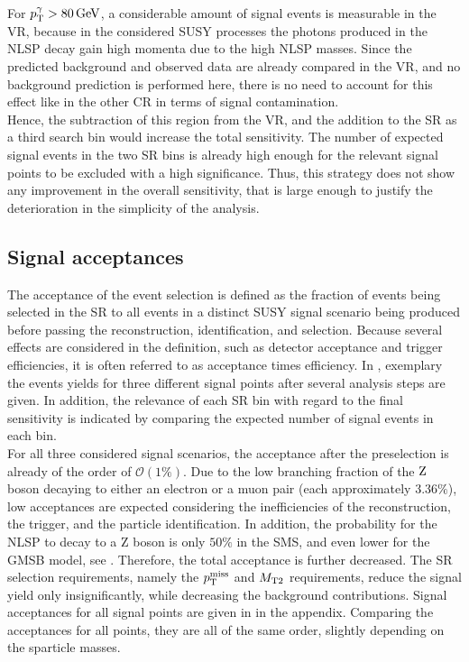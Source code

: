 For $p_{\mathrm{T}}^{\gamma} >80\,\text{Ge\hspace{-.08em}V}$, a considerable amount of signal events is measurable in the VR, because in the considered SUSY processes the photons produced in the NLSP decay gain high momenta due to the high NLSP masses. Since the predicted background and observed data are already compared in the VR, and no background prediction is performed here, there is no need to account for this effect like in the other CR in terms of signal contamination.\\
Hence, the subtraction of this region from the VR, and the addition to the SR as a third search bin would increase the total sensitivity. The number of expected signal events in the two SR bins is already high enough for the relevant signal points to be excluded with a high significance. Thus, this strategy does not show any improvement in the overall sensitivity, that is large enough to justify the deterioration in the simplicity of the analysis.


\subsection*{Signal acceptances}
The acceptance of the event selection is defined as the fraction of events being selected in the SR to all events in a distinct SUSY signal scenario being produced before passing the reconstruction, identification, and selection. Because several effects are considered in the definition, such as detector acceptance and trigger efficiencies, it is often referred to as acceptance times efficiency. In , exemplary the events yields for three different signal points after several analysis steps are given. In addition, the relevance of each SR bin with regard to the final sensitivity is indicated by comparing the expected number of signal events in each bin.\\
For all three considered signal scenarios, the acceptance after the preselection is already of the order of $\mathcal{O}(1\%)$. Due to the low branching fraction of the $\mathrm{Z}$ boson decaying to either an electron or a muon pair (each approximately $3.36\%$), low acceptances are expected considering the inefficiencies of the reconstruction, the trigger, and the particle identification. In addition, the probability for the NLSP to decay to a Z boson is only $50\%$ in the SMS, and even lower for the GMSB model, see . Therefore, the total acceptance is further decreased. The SR selection requirements, namely the $p_{\mathrm{T}}^\text{miss}$ and $M_{\mathrm{T2}}$ requirements, reduce the signal yield only insignificantly, while decreasing the background contributions. Signal acceptances for all signal points are given in  in the appendix. Comparing the acceptances for all points, they are all of the same order, slightly depending on the sparticle masses.

